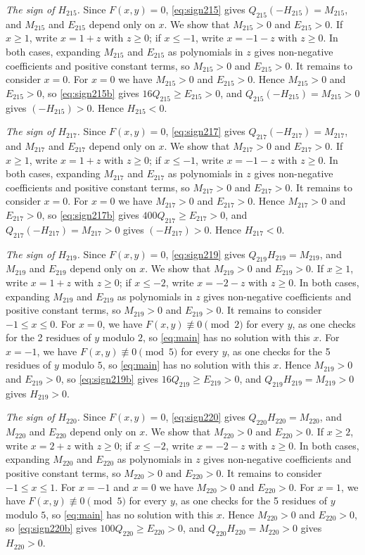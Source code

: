 \documentclass[11pt]{article}
\begin{document}
\emph{The sign of $H_{215}$.} Since $F(x,y)=0$, \eqref{eq:sign215} gives $Q_{215}(-H_{215})=M_{215}$, and $M_{215}$ and $E_{215}$ depend only on $x$. We show that $M_{215}>0$ and $E_{215}>0$. If $x\geq1$, write $x=1+z$ with $z\geq0$; if $x\leq-1$, write $x=-1-z$ with $z\geq0$. In both cases, expanding $M_{215}$ and $E_{215}$ as polynomials in $z$ gives non-negative coefficients and positive constant terms, so $M_{215}>0$ and $E_{215}>0$. It remains to consider $x=0$. For $x=0$ we have $M_{215}>0$ and $E_{215}>0$. Hence $M_{215}>0$ and $E_{215}>0$, so \eqref{eq:sign215b} gives $16Q_{215}\geq E_{215}>0$, and $Q_{215}(-H_{215})=M_{215}>0$ gives $(-H_{215})>0$. Hence $H_{215}<0$.

\emph{The sign of $H_{217}$.} Since $F(x,y)=0$, \eqref{eq:sign217} gives $Q_{217}(-H_{217})=M_{217}$, and $M_{217}$ and $E_{217}$ depend only on $x$. We show that $M_{217}>0$ and $E_{217}>0$. If $x\geq1$, write $x=1+z$ with $z\geq0$; if $x\leq-1$, write $x=-1-z$ with $z\geq0$. In both cases, expanding $M_{217}$ and $E_{217}$ as polynomials in $z$ gives non-negative coefficients and positive constant terms, so $M_{217}>0$ and $E_{217}>0$. It remains to consider $x=0$. For $x=0$ we have $M_{217}>0$ and $E_{217}>0$. Hence $M_{217}>0$ and $E_{217}>0$, so \eqref{eq:sign217b} gives $400Q_{217}\geq E_{217}>0$, and $Q_{217}(-H_{217})=M_{217}>0$ gives $(-H_{217})>0$. Hence $H_{217}<0$.

\emph{The sign of $H_{219}$.} Since $F(x,y)=0$, \eqref{eq:sign219} gives $Q_{219}H_{219}=M_{219}$, and $M_{219}$ and $E_{219}$ depend only on $x$. We show that $M_{219}>0$ and $E_{219}>0$. If $x\geq1$, write $x=1+z$ with $z\geq0$; if $x\leq-2$, write $x=-2-z$ with $z\geq0$. In both cases, expanding $M_{219}$ and $E_{219}$ as polynomials in $z$ gives non-negative coefficients and positive constant terms, so $M_{219}>0$ and $E_{219}>0$. It remains to consider $-1\leq x\leq0$. For $x=0$, we have $F(x,y)\not\equiv0\pmod{2}$ for every $y$, as one checks for the 2 residues of $y$ modulo $2$, so \eqref{eq:main} has no solution with this $x$. For $x=-1$, we have $F(x,y)\not\equiv0\pmod{5}$ for every $y$, as one checks for the 5 residues of $y$ modulo $5$, so \eqref{eq:main} has no solution with this $x$. Hence $M_{219}>0$ and $E_{219}>0$, so \eqref{eq:sign219b} gives $16Q_{219}\geq E_{219}>0$, and $Q_{219}H_{219}=M_{219}>0$ gives $H_{219}>0$.

\emph{The sign of $H_{220}$.} Since $F(x,y)=0$, \eqref{eq:sign220} gives $Q_{220}H_{220}=M_{220}$, and $M_{220}$ and $E_{220}$ depend only on $x$. We show that $M_{220}>0$ and $E_{220}>0$. If $x\geq2$, write $x=2+z$ with $z\geq0$; if $x\leq-2$, write $x=-2-z$ with $z\geq0$. In both cases, expanding $M_{220}$ and $E_{220}$ as polynomials in $z$ gives non-negative coefficients and positive constant terms, so $M_{220}>0$ and $E_{220}>0$. It remains to consider $-1\leq x\leq1$. For $x=-1$ and $x=0$ we have $M_{220}>0$ and $E_{220}>0$. For $x=1$, we have $F(x,y)\not\equiv0\pmod{5}$ for every $y$, as one checks for the 5 residues of $y$ modulo $5$, so \eqref{eq:main} has no solution with this $x$. Hence $M_{220}>0$ and $E_{220}>0$, so \eqref{eq:sign220b} gives $100Q_{220}\geq E_{220}>0$, and $Q_{220}H_{220}=M_{220}>0$ gives $H_{220}>0$.
\end{document}
